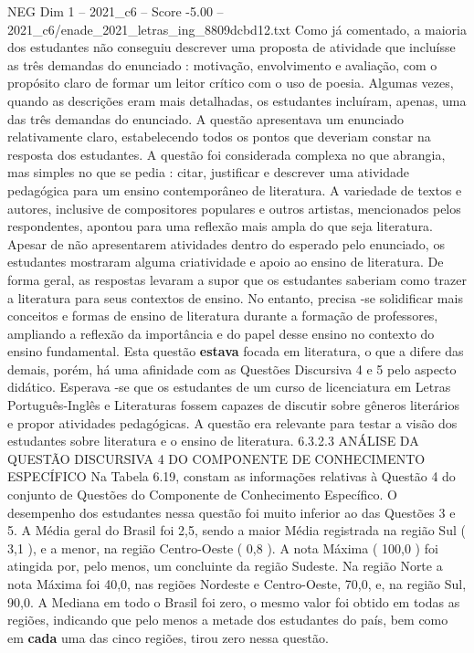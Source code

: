 \begin{textsample}{NEG Dim 1 – 2021\_c6 – Score -5.00 – 2021\_c6/enade\_2021\_letras\_ing\_8809dcbd12.txt}
Como já comentado, a maioria dos estudantes não conseguiu descrever uma proposta de atividade que incluísse as três demandas do enunciado : motivação, envolvimento e avaliação, com o propósito claro de formar um leitor crítico com o uso de poesia.
Algumas vezes, quando as descrições eram mais detalhadas, os estudantes incluíram, apenas, uma das três demandas do enunciado.
A questão apresentava um enunciado relativamente claro, estabelecendo todos os pontos que deveriam constar na resposta dos estudantes.
A questão foi considerada complexa no que abrangia, mas simples no que se pedia : citar, justificar e descrever uma atividade pedagógica para um ensino contemporâneo de literatura.
A variedade de textos e autores, inclusive de compositores populares e outros artistas, mencionados pelos respondentes, apontou para uma reflexão mais ampla do que seja literatura.
Apesar de não apresentarem atividades dentro do esperado pelo enunciado, os estudantes mostraram alguma criatividade e apoio ao ensino de literatura.
De forma geral, as respostas levaram a supor que os estudantes saberiam como trazer a literatura para seus contextos de ensino.
No entanto, precisa -se solidificar mais conceitos e formas de ensino de literatura durante a formação de professores, ampliando a reflexão da importância e do papel desse ensino no contexto do ensino fundamental.
Esta questão \textbf{estava} focada em literatura, o que a difere das demais, porém, há uma afinidade com as Questões Discursiva 4 e 5 pelo aspecto didático.
Esperava -se que os estudantes de um curso de licenciatura em Letras Português-Inglês e Literaturas fossem capazes de discutir sobre gêneros literários e propor atividades pedagógicas.
A questão era relevante para testar a visão dos estudantes sobre literatura e o ensino de literatura. 6.3.2.3 ANÁLISE DA QUESTÃO DISCURSIVA 4 DO COMPONENTE DE CONHECIMENTO ESPECÍFICO Na Tabela 6.19, constam as informações relativas à Questão 4 do conjunto de Questões do Componente de Conhecimento Específico.
O desempenho dos estudantes nessa questão foi muito inferior ao das Questões 3 e 5.
A Média geral do Brasil foi 2,5, sendo a maior Média registrada na região Sul ( 3,1 ), e a menor, na região Centro-Oeste ( 0,8 ).
A nota Máxima ( 100,0 ) foi atingida por, pelo menos, um concluinte da região Sudeste.
Na região Norte a nota Máxima foi 40,0, nas regiões Nordeste e Centro-Oeste, 70,0, e, na região Sul, 90,0.
A Mediana em todo o Brasil foi zero, o mesmo valor foi obtido em todas as regiões, indicando que pelo menos a metade dos estudantes do país, bem como em \textbf{cada} uma das cinco regiões, tirou zero nessa questão.

\end{textsample}
